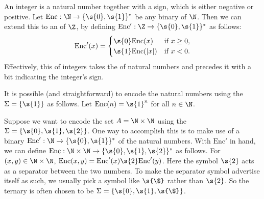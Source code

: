 \begin{flex}
\begin{example} \label{example:Binary-encoding-of-integers}
An integer is a natural number together with a sign, which is either negative or positive. Let $\text{Enc} : \N \to \{\s{0},\s{1}\}^*$ be any binary  of $\N$. Then we can extend this  to an  of $\Z$, by defining $\text{Enc}':\Z \to \{\s{0},\s{1}\}^*$ as follows:
\[
\text{Enc}'(x) = 
\begin{cases}
\s{0}\text{Enc}(x) & \text{if $x \geq 0$}, \\
\s{1}\text{Enc}(|x|) & \text{if $x < 0$}.
\end{cases}
\]
Effectively, this  of integers takes the  of natural numbers and precedes it with a bit indicating the integer's sign.
\end{example}

\begin{example} \label{example:Unary-encoding-of-naturals}
It is possible (and straightforward) to encode the natural numbers using the  $\Sigma = \{\s{1}\}$ as follows. Let $\text{Enc}(n) = \s{1}^n$ for all $n \in \N$.
\end{example}

\begin{example} \label{example:Ternary-encoding-of-pairs-of-naturals}
Suppose we want to encode the set $A = \N \times \N$ using the  $\Sigma = \{\s{0},\s{1},\s{2}\}$. One way to accomplish this is to make use of a binary  $\text{Enc}': \N \to \{\s{0},\s{1}\}^*$ of the natural numbers. With $\text{Enc}'$ in hand, we can define $\text{Enc} : \N \times \N \to \{\s{0},\s{1},\s{2}\}^*$ as follows. For $(x,y) \in \N \times \N$, $\text{Enc}(x,y) = \text{Enc}'(x)\s{2}\text{Enc}'(y)$. Here the symbol $\s{2}$ acts as a separator between the two numbers. To make the separator symbol advertise itself as such, we usually pick a symbol like $\s{\$}$ rather than $\s{2}$. So the ternary  is often chosen to be $\Sigma = \{\s{0},\s{1},\s{\$}\}$.
\end{example}


\end{flex}
